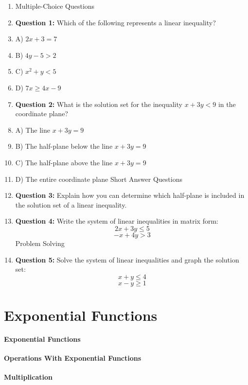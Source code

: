 \begin{enumerate}
    \item Multiple-Choice Questions
    \item \textbf{Question 1:} Which of the following represents a linear inequality?
    \item A) $2x + 3 = 7$
    \item B) $4y - 5 > 2$
    \item C) $x^2 + y < 5$
    \item D) $7x \geq 4x - 9$
    \item \textbf{Question 2:} What is the solution set for the inequality $x + 3y < 9$ in the coordinate plane?
    \item A) The line $x + 3y = 9$
    \item B) The half-plane below the line $x + 3y = 9$
    \item C) The half-plane above the line $x + 3y = 9$
    \item D) The entire coordinate plane Short Answer Questions
    \item \textbf{Question 3:} Explain how you can determine which half-plane is included in the solution set of a linear inequality.
    \item \textbf{Question 4:} Write the system of linear inequalities in matrix form: $$ 2x + 3y \leq 5 $$ $$ -x + 4y > 3$$ Problem Solving
    \item \textbf{Question 5:} Solve the system of linear inequalities and graph the solution set: $$ x + y \leq 4 $$ $$ x - y \geq 1 $$
\end{enumerate}

\section{Exponential Functions}
\label{sec:exponential-functions}

\paragraph{Exponential Functions}

\paragraph{Operations With Exponential Functions}

\paragraph{Multiplication}

